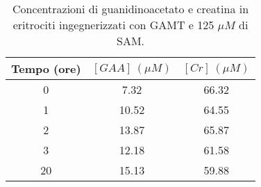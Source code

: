 	\begin{table}[H]
		\centering
		\begin{tabular}{| c | c | c |}
			\hline
			Tempo (ore) & $[GAA]\ (\mu M)$ & $[Cr]\ (\mu M)$ \\
			\hline
			0 & 7.32 & 66.32\\
			\hline
			1 & 10.52 & 64.55\\
			\hline
			2 & 13.87 & 65.87\\
			\hline
			3 & 12.18 & 61.58\\
			\hline
			20 & 15.13 & 59.88\\
			\hline
		\end{tabular}
		\caption{Concentrazioni di guanidinoacetato e creatina in eritrociti ingegnerizzati con GAMT e 125 $\mu M$ di SAM.}
		\label{tab:125um}
	\end{table}
